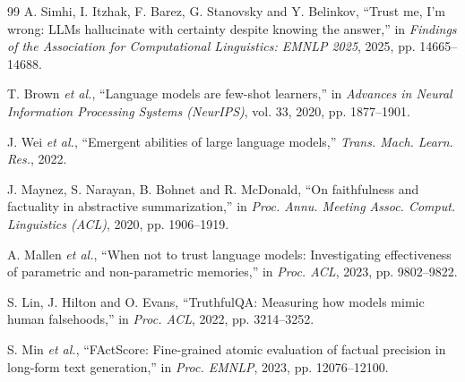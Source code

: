 \documentclass[conference]{IEEEtran}
\begin{document}
\begin{thebibliography}{99}
A. Simhi, I. Itzhak, F. Barez, G. Stanovsky and Y. Belinkov, ``Trust me, I'm
wrong: LLMs hallucinate with certainty despite knowing the answer,'' in
\emph{Findings of the Association for Computational Linguistics: EMNLP 2025},
2025, pp. 14665--14688.

T. Brown \emph{et al.}, ``Language models are few-shot learners,'' in
\emph{Advances in Neural Information Processing Systems (NeurIPS)}, vol. 33,
2020, pp. 1877--1901.

J. Wei \emph{et al.}, ``Emergent abilities of large language models,''
\emph{Trans. Mach. Learn. Res.}, 2022.

J. Maynez, S. Narayan, B. Bohnet and R. McDonald, ``On faithfulness and
factuality in abstractive summarization,'' in \emph{Proc. Annu. Meeting Assoc.
Comput. Linguistics (ACL)}, 2020, pp. 1906--1919.

A. Mallen \emph{et al.}, ``When not to trust language models: Investigating
effectiveness of parametric and non-parametric memories,'' in \emph{Proc. ACL},
2023, pp. 9802--9822.

S. Lin, J. Hilton and O. Evans, ``TruthfulQA: Measuring how models mimic human
falsehoods,'' in \emph{Proc. ACL}, 2022, pp. 3214--3252.

S. Min \emph{et al.}, ``FActScore: Fine-grained atomic evaluation of factual
precision in long-form text generation,'' in \emph{Proc. EMNLP}, 2023,
pp. 12076--12100.

\end{thebibliography}
\end{document}
